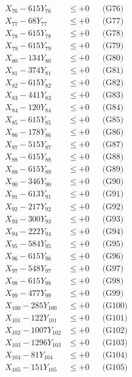 \documentclass[a4paper,10pt]{article}
\begin{document}
{\begin{align}
X_{76} - 615Y_{76} &\leq +0 && \text{(G76)} \\
X_{77} - 68Y_{77} &\leq +0 && \text{(G77)} \\
X_{78} - 615Y_{78} &\leq +0 && \text{(G78)} \\
X_{79} - 615Y_{79} &\leq +0 && \text{(G79)} \\
X_{80} - 134Y_{80} &\leq +0 && \text{(G80)} \\
\allowbreak
X_{81} - 374Y_{81} &\leq +0 && \text{(G81)} \\
X_{82} - 615Y_{82} &\leq +0 && \text{(G82)} \\
X_{83} - 441Y_{83} &\leq +0 && \text{(G83)} \\
X_{84} - 120Y_{84} &\leq +0 && \text{(G84)} \\
X_{85} - 615Y_{85} &\leq +0 && \text{(G85)} \\
X_{86} - 178Y_{86} &\leq +0 && \text{(G86)} \\
X_{87} - 515Y_{87} &\leq +0 && \text{(G87)} \\
X_{88} - 615Y_{88} &\leq +0 && \text{(G88)} \\
X_{89} - 615Y_{89} &\leq +0 && \text{(G89)} \\
X_{90} - 346Y_{90} &\leq +0 && \text{(G90)} \\
\allowbreak
X_{91} - 613Y_{91} &\leq +0 && \text{(G91)} \\
X_{92} - 217Y_{92} &\leq +0 && \text{(G92)} \\
X_{93} - 300Y_{93} &\leq +0 && \text{(G93)} \\
X_{94} - 222Y_{94} &\leq +0 && \text{(G94)} \\
X_{95} - 584Y_{95} &\leq +0 && \text{(G95)} \\
X_{96} - 615Y_{96} &\leq +0 && \text{(G96)} \\
X_{97} - 548Y_{97} &\leq +0 && \text{(G97)} \\
X_{98} - 615Y_{98} &\leq +0 && \text{(G98)} \\
X_{99} - 477Y_{99} &\leq +0 && \text{(G99)} \\
X_{100} - 285Y_{100} &\leq +0 && \text{(G100)} \\
\allowbreak
X_{101} - 122Y_{101} &\leq +0 && \text{(G101)} \\
X_{102} - 1007Y_{102} &\leq +0 && \text{(G102)} \\
X_{103} - 1296Y_{103} &\leq +0 && \text{(G103)} \\
X_{104} - 81Y_{104} &\leq +0 && \text{(G104)} \\
X_{105} - 151Y_{105} &\leq +0 && \text{(G105)} \\

\end{align}}
\end{document}
